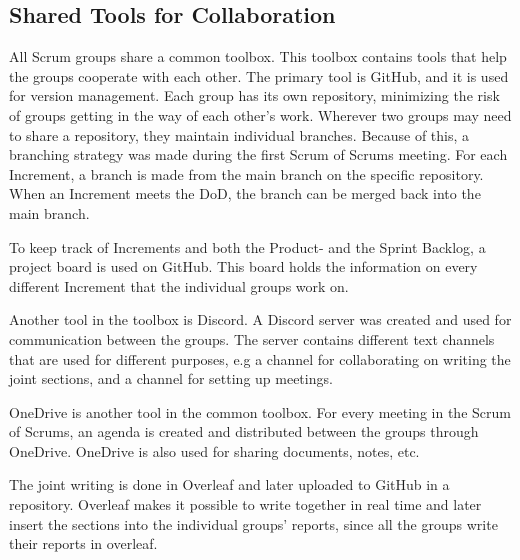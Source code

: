 \subsection{Shared Tools for Collaboration}\label{sub:shared-tools-for-collaboration}
All Scrum groups share a common toolbox.
This toolbox contains tools that help the groups cooperate with each other.
The primary tool is GitHub, and it is used for version management.  
Each group has its own repository, minimizing the risk of groups getting in the way of each other's work.
Wherever two groups may need to share a repository, they maintain individual branches.
Because of this, a branching strategy was made during the first Scrum of Scrums meeting.
For each Increment, a branch is made from the main branch on the specific repository. 
When an Increment meets the DoD, the branch can be merged back into the main branch.

To keep track of Increments and both the Product- and the Sprint Backlog, a project board is used on GitHub.
This board holds the information on every different Increment that the individual groups work on.

Another tool in the toolbox is Discord.
A Discord server was created and used for communication between the groups.
The server contains different text channels that are used for different purposes, e.g a channel for collaborating on writing the joint sections, and a channel for setting up meetings.

OneDrive is another tool in the common toolbox.
For every meeting in the Scrum of Scrums, an agenda is created and distributed between the groups through OneDrive.
OneDrive is also used for sharing documents, notes, etc.

The joint writing is done in Overleaf and later uploaded to GitHub in a repository.
Overleaf makes it possible to write together in real time and later insert the sections into the individual groups' reports, since all the groups write their reports in overleaf.
